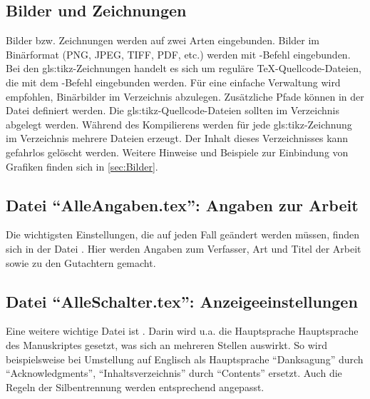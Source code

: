 \subsection[Bilder und Zeichnungen]{Bilder und Zeichnungen}%
%
%
\label{sec:BilderUndZeichnungen}
%
Bilder bzw. Zeichnungen werden auf zwei Arten eingebunden.
Bilder im Binärformat (PNG, JPEG, TIFF, PDF, etc.)
werden mit -Befehl eingebunden. 
Bei den \gls{gls:tikz}-Zeichnungen handelt es sich um reguläre TeX-Quellcode-Dateien,
die mit dem \verb++-Befehl eingebunden werden.
Für eine einfache Verwaltung wird empfohlen, Binärbilder im Verzeichnis  abzulegen.
Zusätzliche Pfade können in der Datei  definiert werden.
Die \gls{gls:tikz}-Quellcode-Dateien sollten im Verzeichnis  abgelegt werden.
Während des Kompilierens werden für jede \gls{gls:tikz}-Zeichnung im Verzeichnis  mehrere Dateien erzeugt.
Der Inhalt dieses Verzeichnisses kann gefahrlos gelöscht werden.
Weitere Hinweise und Beispiele zur Einbindung von Grafiken finden sich in \cref{sec:Bilder}.

\subsection[Datei \enquote{AlleAngaben.tex}: Angaben zur Arbeit]{Datei \enquote{AlleAngaben.tex}: Angaben zur Arbeit}%
%
%
\label{sec:Angaben}
%
Die wichtigsten Einstellungen, die auf jeden Fall geändert werden müssen,
finden sich in der Datei .
Hier werden \ua Angaben zum Verfasser, Art und Titel der Arbeit sowie zu den Gutachtern gemacht.

\subsection[Datei \enquote{AlleSchalter.tex}: Anzeigeeinstellungen]{Datei \enquote{AlleSchalter.tex}: Anzeigeeinstellungen}%
%
\label{sec:Schalter}
%
Eine weitere wichtige Datei ist .
Darin wird u.a. die Hauptsprache Hauptsprache des Manuskriptes gesetzt, was sich an mehreren Stellen auswirkt.
So wird beispielsweise bei Umstellung auf Englisch als Hauptsprache
\enquote{Danksagung} durch \enquote{Acknowledgments},
\enquote{Inhaltsverzeichnis} durch \enquote{Contents}
\usw ersetzt.
Auch die Regeln der Silbentrennung werden entsprechend angepasst.

